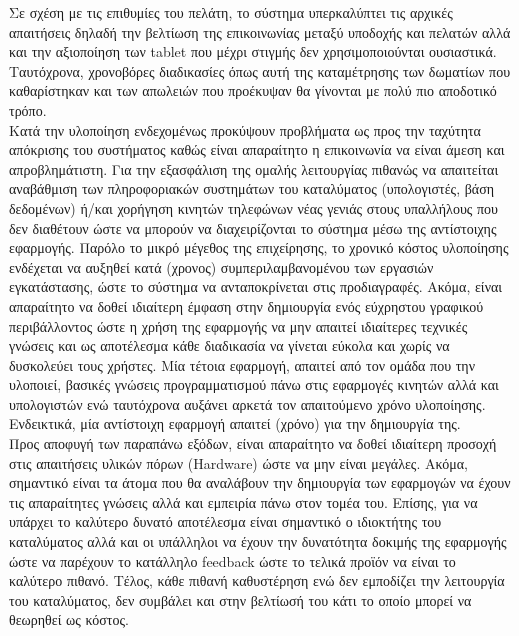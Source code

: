 \noindent
Σε σχέση με τις επιθυμίες του πελάτη, το σύστημα υπερκαλύπτει τις αρχικές απαιτήσεις δηλαδή την 
βελτίωση της επικοινωνίας μεταξύ υποδοχής και πελατών αλλά και την αξιοποίηση των tablet που μέχρι 
στιγμής δεν χρησιμοποιούνται ουσιαστικά. Ταυτόχρονα, χρονοβόρες διαδικασίες όπως αυτή της 
καταμέτρησης των δωματίων που καθαρίστηκαν και των απωλειών που προέκυψαν θα γίνονται με πολύ πιο 
αποδοτικό τρόπο. \\

\noindent
Κατά την υλοποίηση ενδεχομένως προκύψουν προβλήματα ως προς την ταχύτητα απόκρισης του συστήματος 
καθώς είναι απαραίτητο η επικοινωνία να είναι άμεση και απροβλημάτιστη. Για την εξασφάλιση της ομαλής 
λειτουργίας πιθανώς να απαιτείται αναβάθμιση των πληροφοριακών συστημάτων του καταλύματος 
(υπολογιστές, βάση δεδομένων) ή/και χορήγηση κινητών τηλεφώνων νέας γενιάς στους υπαλλήλους που δεν 
διαθέτουν ώστε  να μπορούν να διαχειρίζονται το σύστημα μέσω της αντίστοιχης εφαρμογής. Παρόλο το 
μικρό μέγεθος της επιχείρησης, το χρονικό κόστος υλοποίησης ενδέχεται να αυξηθεί κατά (χρονος) 
συμπεριλαμβανομένου των εργασιών εγκατάστασης, ώστε το σύστημα να ανταποκρίνεται στις προδιαγραφές.
Ακόμα, είναι απαραίτητο να δοθεί ιδιαίτερη έμφαση στην δημιουργία ενός εύχρηστου γραφικού 
περιβάλλοντος ώστε η χρήση της εφαρμογής να μην απαιτεί ιδιαίτερες τεχνικές γνώσεις και ως αποτέλεσμα 
κάθε διαδικασία να γίνεται εύκολα και χωρίς να δυσκολεύει τους χρήστες. Μία τέτοια εφαρμογή, απαιτεί 
από τον ομάδα που την υλοποιεί, βασικές γνώσεις προγραμματισμού πάνω στις εφαρμογές κινητών αλλά και 
υπολογιστών ενώ ταυτόχρονα αυξάνει αρκετά τον απαιτούμενο χρόνο υλοποίησης. Ενδεικτικά, μία 
αντίστοιχη εφαρμογή  απαιτεί (χρόνο) για την δημιουργία της.\\ 

\noindent
Προς αποφυγή των παραπάνω εξόδων, είναι απαραίτητο να δοθεί ιδιαίτερη προσοχή στις απαιτήσεις υλικών 
πόρων (Hardware) ώστε να μην είναι μεγάλες. Ακόμα, σημαντικό είναι τα άτομα που θα αναλάβουν την 
δημιουργία των εφαρμογών να έχουν τις απαραίτητες γνώσεις αλλά και εμπειρία πάνω στον τομέα του. 
Επίσης, για να υπάρχει το καλύτερο δυνατό αποτέλεσμα είναι σημαντικό ο ιδιοκτήτης του καταλύματος 
αλλά και οι υπάλληλοι να έχουν την δυνατότητα δοκιμής της εφαρμογής ώστε να παρέχουν το κατάλληλο 
feedback ώστε το τελικά προϊόν να είναι το καλύτερο πιθανό. Τέλος, κάθε πιθανή καθυστέρηση ενώ δεν 
εμποδίζει την λειτουργία του καταλύματος, δεν συμβάλει και στην βελτίωσή του κάτι το οποίο μπορεί να 
θεωρηθεί ως κόστος.
		
		
		    